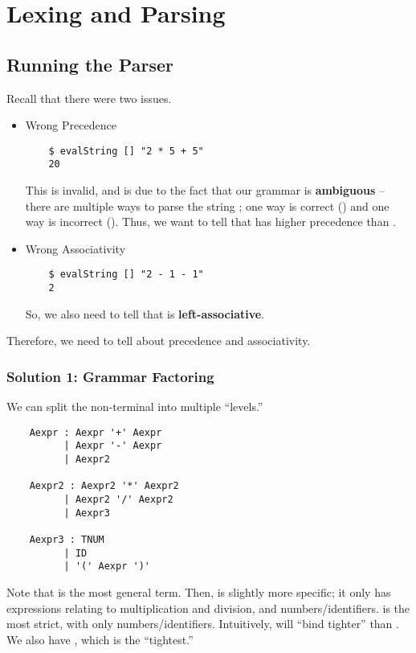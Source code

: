 \documentclass[letterpaper]{article}
\begin{document}
\section{Lexing and Parsing}
\subsection{Running the Parser}

Recall that there were two issues. 
\begin{itemize}
    \item Wrong Precedence
    \begin{verbatim}
    $ evalString [] "2 * 5 + 5"
    20\end{verbatim}
    This is invalid, and is due to the fact that our grammar is \textbf{ambiguous} -- there are multiple ways to parse the string ; one way is correct () and one way is incorrect (). Thus, we want to tell  that \code{*} has higher precedence than \code{+}.

    \item Wrong Associativity
    \begin{verbatim}
    $ evalString [] "2 - 1 - 1"
    2\end{verbatim}
    So, we also need to tell  that \code{-} is \textbf{left-associative}.     
\end{itemize}
Therefore, we need to tell  about precedence and associativity. 

\subsubsection{Solution 1: Grammar Factoring}
We can split the  non-terminal into multiple ``levels.''
\begin{verbatim}
    Aexpr : Aexpr '+' Aexpr
          | Aexpr '-' Aexpr
          | Aexpr2

    Aexpr2 : Aexpr2 '*' Aexpr2
          | Aexpr2 '/' Aexpr2
          | Aexpr3

    Aexpr3 : TNUM
          | ID
          | '(' Aexpr ')'\end{verbatim}
Note that  is the most general term. Then,  is slightly more specific; it only has expressions relating to multiplication and division, and numbers/identifiers.  is the most strict, with only numbers/identifiers. Intuitively,  will ``bind tighter'' than . We also have , which is the ``tightest.''
\end{document}
